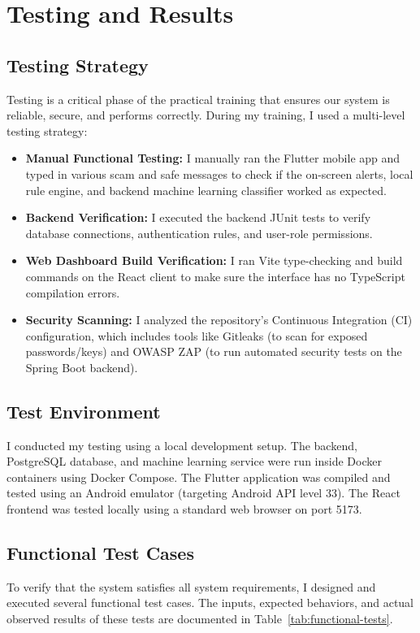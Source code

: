 \chapter{Testing and Results}
\label{ch:testing}

\section{Testing Strategy}
Testing is a critical phase of the practical training that ensures our system is reliable, secure, and performs correctly. During my training, I used a multi-level testing strategy:
\begin{itemize}
  \item \textbf{Manual Functional Testing:} I manually ran the Flutter mobile app and typed in various scam and safe messages to check if the on-screen alerts, local rule engine, and backend machine learning classifier worked as expected.
  \item \textbf{Backend Verification:} I executed the backend JUnit tests to verify database connections, authentication rules, and user-role permissions.
  \item \textbf{Web Dashboard Build Verification:} I ran Vite type-checking and build commands on the React client to make sure the interface has no TypeScript compilation errors.
  \item \textbf{Security Scanning:} I analyzed the repository's Continuous Integration (CI) configuration, which includes tools like Gitleaks (to scan for exposed passwords/keys) and OWASP ZAP (to run automated security tests on the Spring Boot backend).
\end{itemize}

\section{Test Environment}
I conducted my testing using a local development setup. The backend, PostgreSQL database, and machine learning service were run inside Docker containers using Docker Compose. The Flutter application was compiled and tested using an Android emulator (targeting Android API level 33). The React frontend was tested locally using a standard web browser on port 5173.

\section{Functional Test Cases}
To verify that the system satisfies all system requirements, I designed and executed several functional test cases. The inputs, expected behaviors, and actual observed results of these tests are documented in Table~\ref{tab:functional-tests}.

